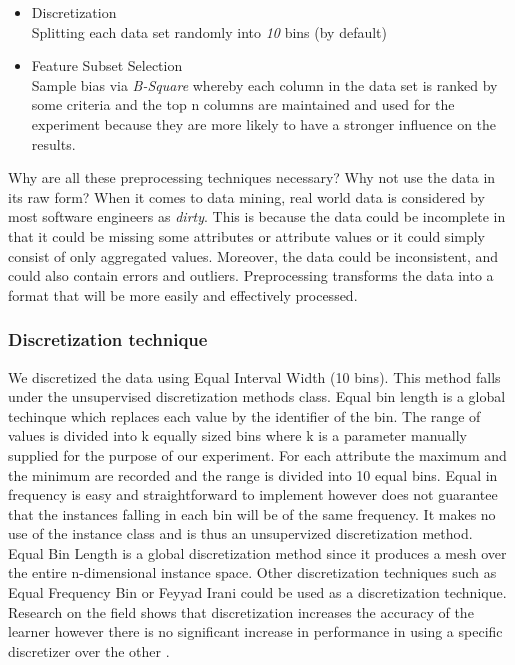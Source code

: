 \documentclass{sig-alternate}
\begin{document}
\begin{itemize}
\item{Discretization}
\\Splitting each data set randomly into {\em 10} bins (by default)
\item{Feature Subset Selection}
\\Sample bias via {\em B-Square} whereby each column in the data set is ranked by some criteria and the top n columns are maintained and used for the experiment because they are more likely to have a stronger influence on the results.
\end{itemize}
Why are all these preprocessing techniques necessary? Why not use the data in its raw form? When it comes to data mining, real world data is considered by most software engineers as {\em dirty}. This is because the data could be incomplete in that it could be missing some attributes or attribute values or it could simply consist of only aggregated values. Moreover, the data could be inconsistent, and could also contain errors and outliers. Preprocessing transforms the data into a format that will be more easily and effectively processed.


\subsubsection{Discretization technique}
We discretized the data using Equal Interval Width (10 bins). This method falls under the unsupervised discretization methods class. Equal bin length is a global techinque which replaces each value by the identifier of the bin. The range of values is divided into k equally sized bins where k is a parameter manually supplied for the purpose of our experiment. For each attribute the maximum and the minimum are recorded and the range is divided into 10 equal bins. Equal in frequency is easy and straightforward to implement however does not guarantee that the instances falling in each bin will be of the same frequency. It makes no use of the instance class and is thus an unsupervized discretization method. Equal Bin Length is a global discretization method since it produces a mesh over the entire n-dimensional instance space. Other discretization techniques such as Equal Frequency Bin or Feyyad Irani could be used as a discretization technique. Research on the field shows that discretization increases the accuracy of the learner however there is no significant increase in performance in using a specific discretizer over the other \cite {dough95}.
\end{document}
